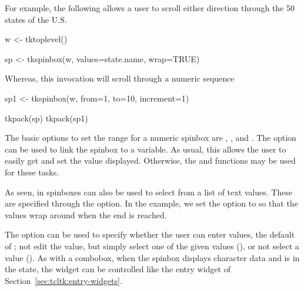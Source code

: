 For example, the following allows a user to scroll either direction through the 50
states of the U.S.

\begin{Schunk}
\begin{Sinput}
 w <- tktoplevel()
\end{Sinput}
\end{Schunk}
\begin{Schunk}
\begin{Sinput}
 sp <- tkspinbox(w, values=state.name, wrap=TRUE)
\end{Sinput}
\end{Schunk}

Whereas, this invocation will scroll through a numeric sequence
\begin{Schunk}
\begin{Sinput}
 sp1 <- tkspinbox(w, from=1, to=10, increment=1)
\end{Sinput}
\end{Schunk}

\begin{Schunk}
\begin{Sinput}
 tkpack(sp)
 tkpack(sp1)
\end{Sinput}
\end{Schunk}


The basic options to set the range for a numeric spinbox are
, , and
.  The 
option can be used to link the spinbox to a \TCL\/ variable. As usual,
this allows the user to easily get and set the value
displayed. Otherwise, the  and 
functions may be used for these tasks. 

As seen, in \TK spinboxes can also be used to select from a list of text
values. These are specified through the 
option. In the example, we set the  option to 
so that the values wrap around when
the end is reached. 
 
The option  can be used to specify whether
the user can enter values, the default of ; not edit the
value, but simply select one of the given values (),
or not select a value ().  As with a combobox, when
the \TK\/ spinbox displays character data and is in the 
state, the widget can be controlled like the entry widget of
Section~\ref{sec:tcltk:entry-widgets}.



